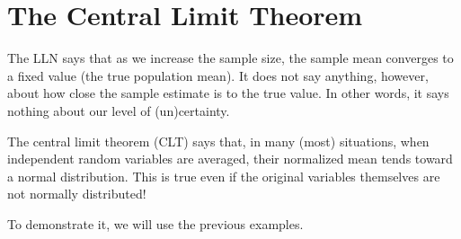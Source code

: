 


\section{The Central Limit Theorem}
The LLN says that as we increase the sample size, the sample mean converges to a fixed value (the true population mean).  It does not say anything, however, about how close the sample estimate is to the true value. In other words, it says nothing about our level of (un)certainty. 

The central limit theorem (CLT) says that, in many (most) situations, when independent random variables are averaged, their normalized mean tends toward a normal distribution. This is true even if the original variables themselves are not normally distributed!

To demonstrate it, we will use the previous examples.

